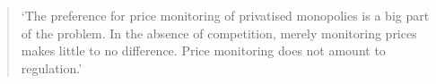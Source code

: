 \begin{quote}
    `The preference for price monitoring of privatised monopolies is a big part of the problem. In the absence of competition, merely monitoring prices makes little to no difference. Price monitoring does not amount to regulation.'

\end{quote}     

